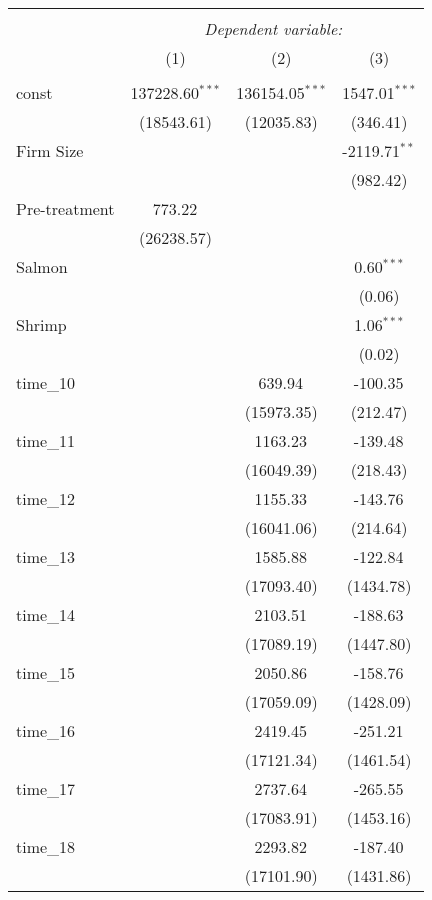 \begin{table}[!htbp] \centering
\begin{tabular}{@{\extracolsep{5pt}}lccc}
\\[-1.8ex]\hline
\hline \\[-1.8ex]
& \multicolumn{3}{c}{\textit{Dependent variable:}} \
\cr \cline{3-4}
\\[-1.8ex] & (1) & (2) & (3) \\
\hline \\[-1.8ex]
 const & 137228.60$^{***}$ & 136154.05$^{***}$ & 1547.01$^{***}$ \\
  & (18543.61) & (12035.83) & (346.41) \\
 Firm Size & & & -2119.71$^{**}$ \\
  & & & (982.42) \\
 Pre-treatment & 773.22$^{}$ & & \\
  & (26238.57) & & \\
 Salmon & & & 0.60$^{***}$ \\
  & & & (0.06) \\
 Shrimp & & & 1.06$^{***}$ \\
  & & & (0.02) \\
 time_10 & & 639.94$^{}$ & -100.35$^{}$ \\
  & & (15973.35) & (212.47) \\
 time_11 & & 1163.23$^{}$ & -139.48$^{}$ \\
  & & (16049.39) & (218.43) \\
 time_12 & & 1155.33$^{}$ & -143.76$^{}$ \\
  & & (16041.06) & (214.64) \\
 time_13 & & 1585.88$^{}$ & -122.84$^{}$ \\
  & & (17093.40) & (1434.78) \\
 time_14 & & 2103.51$^{}$ & -188.63$^{}$ \\
  & & (17089.19) & (1447.80) \\
 time_15 & & 2050.86$^{}$ & -158.76$^{}$ \\
  & & (17059.09) & (1428.09) \\
 time_16 & & 2419.45$^{}$ & -251.21$^{}$ \\
  & & (17121.34) & (1461.54) \\
 time_17 & & 2737.64$^{}$ & -265.55$^{}$ \\
  & & (17083.91) & (1453.16) \\
 time_18 & & 2293.82$^{}$ & -187.40$^{}$ \\
  & & (17101.90) & (1431.86) \\

\end{tabular}
\end{table}
